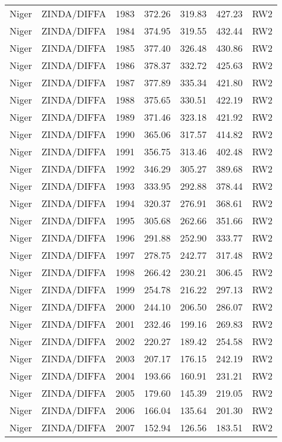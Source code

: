 \begin{longtable}{lllrrrl}
  Niger & ZINDA/DIFFA & 1983 & 372.26 & 319.83 & 427.23 & RW2 \\ 
  Niger & ZINDA/DIFFA & 1984 & 374.95 & 319.55 & 432.44 & RW2 \\ 
  Niger & ZINDA/DIFFA & 1985 & 377.40 & 326.48 & 430.86 & RW2 \\ 
  Niger & ZINDA/DIFFA & 1986 & 378.37 & 332.72 & 425.63 & RW2 \\ 
  Niger & ZINDA/DIFFA & 1987 & 377.89 & 335.34 & 421.80 & RW2 \\ 
  Niger & ZINDA/DIFFA & 1988 & 375.65 & 330.51 & 422.19 & RW2 \\ 
  Niger & ZINDA/DIFFA & 1989 & 371.46 & 323.18 & 421.92 & RW2 \\ 
  Niger & ZINDA/DIFFA & 1990 & 365.06 & 317.57 & 414.82 & RW2 \\ 
  Niger & ZINDA/DIFFA & 1991 & 356.75 & 313.46 & 402.48 & RW2 \\ 
  Niger & ZINDA/DIFFA & 1992 & 346.29 & 305.27 & 389.68 & RW2 \\ 
  Niger & ZINDA/DIFFA & 1993 & 333.95 & 292.88 & 378.44 & RW2 \\ 
  Niger & ZINDA/DIFFA & 1994 & 320.37 & 276.91 & 368.61 & RW2 \\ 
  Niger & ZINDA/DIFFA & 1995 & 305.68 & 262.66 & 351.66 & RW2 \\ 
  Niger & ZINDA/DIFFA & 1996 & 291.88 & 252.90 & 333.77 & RW2 \\ 
  Niger & ZINDA/DIFFA & 1997 & 278.75 & 242.77 & 317.48 & RW2 \\ 
  Niger & ZINDA/DIFFA & 1998 & 266.42 & 230.21 & 306.45 & RW2 \\ 
  Niger & ZINDA/DIFFA & 1999 & 254.78 & 216.22 & 297.13 & RW2 \\ 
  Niger & ZINDA/DIFFA & 2000 & 244.10 & 206.50 & 286.07 & RW2 \\ 
  Niger & ZINDA/DIFFA & 2001 & 232.46 & 199.16 & 269.83 & RW2 \\ 
  Niger & ZINDA/DIFFA & 2002 & 220.27 & 189.42 & 254.58 & RW2 \\ 
  Niger & ZINDA/DIFFA & 2003 & 207.17 & 176.15 & 242.19 & RW2 \\ 
  Niger & ZINDA/DIFFA & 2004 & 193.66 & 160.91 & 231.21 & RW2 \\ 
  Niger & ZINDA/DIFFA & 2005 & 179.60 & 145.39 & 219.05 & RW2 \\ 
  Niger & ZINDA/DIFFA & 2006 & 166.04 & 135.64 & 201.30 & RW2 \\ 
  Niger & ZINDA/DIFFA & 2007 & 152.94 & 126.56 & 183.51 & RW2 \\ 

\end{longtable}
